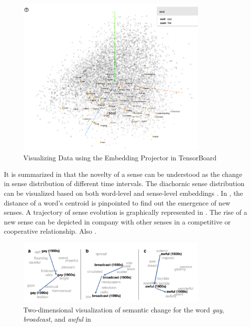 \begin{figure}[H]
  \centering
  \includegraphics[width=0.85\textwidth,keepaspectratio]{figures_ref/embedding_projector_demo}
  \caption{Visualizing Data using the Embedding Projector in TensorBoard}
\end{figure}

It is summarized in \textcite{tang2018state} that the novelty of a sense can be understood as the change in sense distribution of different time intervals. The diachornic sense distribution can be visualized based on both word-level and sense-level embeddings \parencite{dubossarsky2015bottom,hu2019diachronic}. In \textcite{dubossarsky2015bottom}, the distance of a word's centroid is pinpointed to find out the emergence of new senses. A trajectory of sense evolution is graphically represented in \textcite{hu2019diachronic}. The rise of a new sense can be depicted in company with other senses in a competitive or cooperative relationship. Also \parencite{gonen2020simple}.

\begin{figure}[H]
  \centering
  \includegraphics[width=0.85\textwidth,keepaspectratio]{figures_ref/Hamilton_et_al_2016_two_dimension_viz_of_semantic_change.png}
  \caption{Two-dimensional visualization of semantic change for the word \textit{gay}, \textit{broadcast}, and \textit{awful} in \textcite{hamilton2016law}}
\end{figure}

